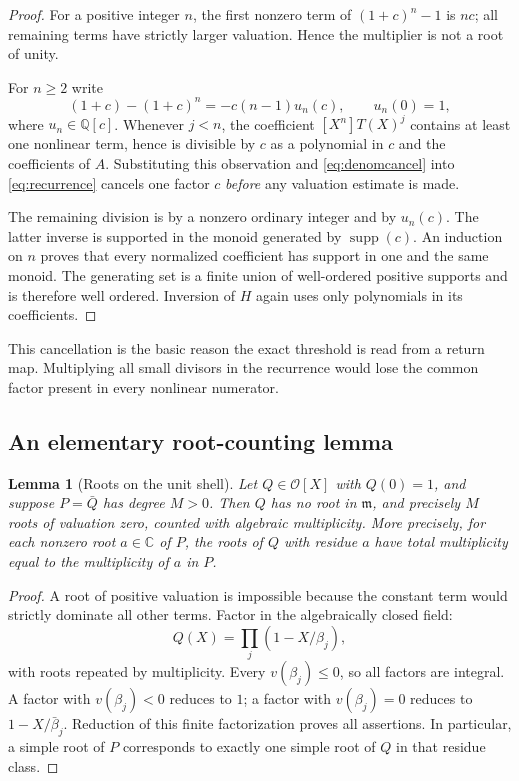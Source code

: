 \documentclass[11pt,letterpaper]{article}
\numberwithin{equation}{section}
\theoremstyle{plain}
\newtheorem{lemma}[theorem]{Lemma}
\theoremstyle{definition}
\theoremstyle{remark}
\newcommand{\C}{\mathbb C}
\newcommand{\Q}{\mathbb Q}
\newcommand{\OO}{\mathcal O}
\newcommand{\mm}{\mathfrak m}
\newcommand{\supp}{\operatorname{supp}}
\begin{document}
\begin{proof}
For a positive integer $n$, the first nonzero term of $(1+c)^n-1$ is $nc$;
all remaining terms have strictly larger valuation. Hence the multiplier is
not a root of unity.

For $n\ge2$ write
\begin{equation}\label{eq:denomcancel}
 (1+c)-(1+c)^n=-c(n-1)u_n(c),\qquad u_n(0)=1,
\end{equation}
where $u_n\in\Q[c]$. Whenever $j<n$, the coefficient
$[X^n]T(X)^j$ contains at least one nonlinear term, hence is divisible by
$c$ as a polynomial in $c$ and the coefficients of $A$. Substituting this
observation and \eqref{eq:denomcancel} into \eqref{eq:recurrence} cancels
one factor $c$ \emph{before} any valuation estimate is made.

The remaining division is by a nonzero ordinary integer and by $u_n(c)$.
The latter inverse is supported in the monoid generated by $\supp(c)$.
An induction on $n$ proves that every normalized coefficient has support in
one and the same monoid. The generating set is a finite union of well-ordered
positive supports and is therefore well ordered. Inversion of $H$ again uses
only polynomials in its coefficients.
\end{proof}

This cancellation is the basic reason the exact threshold is read from a
return map. Multiplying all small divisors in the recurrence would lose the
common factor present in every nonlinear numerator.

\subsection{An elementary root-counting lemma}

\begin{lemma}[Roots on the unit shell]\label{lem:root-count}
Let $Q\in\OO[X]$ with $Q(0)=1$, and suppose $P=\bar Q$ has degree
$M>0$. Then $Q$ has no root in $\mm$, and precisely $M$ roots of valuation
zero, counted with algebraic multiplicity. More precisely, for each nonzero
root $a\in\C$ of $P$, the roots of $Q$ with residue $a$ have total
multiplicity equal to the multiplicity of $a$ in $P$.
\end{lemma}

\begin{proof}
A root of positive valuation is impossible because the constant term would
strictly dominate all other terms. Factor in the algebraically closed field:
\[
 Q(X)=\prod_j(1-X/\beta_j),
\]
with roots repeated by multiplicity. Every $v(\beta_j)\le0$, so all factors
are integral. A factor with $v(\beta_j)<0$ reduces to $1$; a factor with
$v(\beta_j)=0$ reduces to $1-X/\bar\beta_j$. Reduction of this finite
factorization proves all assertions. In particular, a simple root of $P$
corresponds to exactly one simple root of $Q$ in that residue class.
\end{proof}
\end{document}
